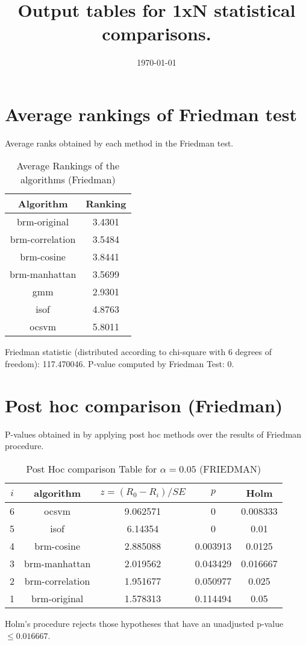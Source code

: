 \documentclass[a4paper,10pt]{article}
\title{Output tables for 1xN statistical comparisons.}
\author{}
\date{\today}
\begin{document}
\begin{landscape}
\pagestyle{empty}
\maketitle
\thispagestyle{empty}

\section{Average rankings of Friedman test}


Average ranks obtained by each method in the Friedman test.

\begin{table}[!htp]
\centering
\begin{tabular}{|c|c|}\hline
Algorithm&Ranking\\\hline
brm-original&3.4301\\brm-correlation&3.5484\\brm-cosine&3.8441\\brm-manhattan&3.5699\\gmm&2.9301\\isof&4.8763\\ocsvm&5.8011\\\hline\end{tabular}
\caption{Average Rankings of the algorithms (Friedman)}
\end{table}

Friedman statistic (distributed according to chi-square with 6 degrees of freedom): 117.470046. \newline P-value computed by Friedman Test: 0.\newline


\newpage

\section{Post hoc comparison (Friedman)}


P-values obtained in by applying post hoc methods over the results of Friedman procedure.

\begin{table}[!htp]
\centering\footnotesize
\begin{tabular}{ccccc}
$i$&algorithm&$z=(R_0 - R_i)/SE$&$p$&Holm \\
\hline6&ocsvm&9.062571&0&0.008333\\5&isof&6.14354&0&0.01\\4&brm-cosine&2.885088&0.003913&0.0125\\3&brm-manhattan&2.019562&0.043429&0.016667\\2&brm-correlation&1.951677&0.050977&0.025\\1&brm-original&1.578313&0.114494&0.05\\\hline
\end{tabular}
\caption{Post Hoc comparison Table for $\alpha=0.05$ (FRIEDMAN)}
\end{table}Holm's procedure rejects those hypotheses that have an unadjusted p-value $\le0.016667$.



\end{landscape}
\end{document}
